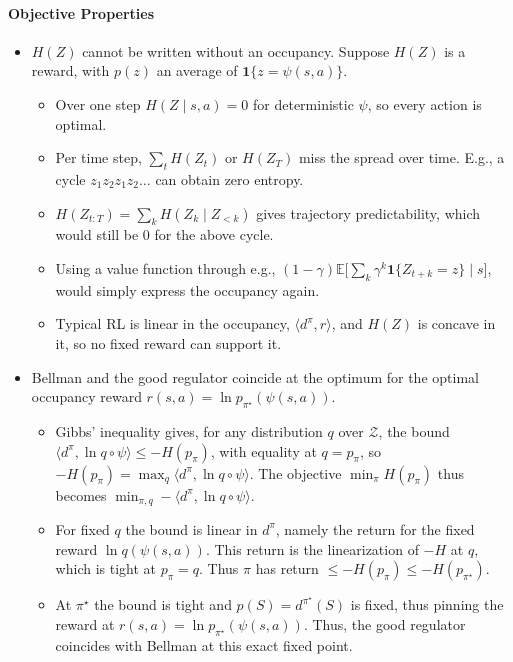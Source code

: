 \documentclass[10pt]{article}
\begin{document}
\paragraph{Objective Properties}
\begin{itemize}
  \item $H(Z)$ cannot be written without an occupancy.
    Suppose $H(Z)$ is a reward, with $p(z)$ an average of $\mathbf 1\{z = \psi(s,a)\}$.
  \begin{itemize}
    \item Over one step $H(Z \mid s,a) = 0$ for deterministic $\psi$, so every action is optimal.
    \item Per time step, $\sum_t H(Z_t)$ or $H(Z_T)$ miss the spread over time.
      E.g., a cycle $z_1 z_2 z_1 z_2 \dots$ can obtain zero entropy.
    \item $H(Z_{t:T}) = \sum_k H(Z_k \mid Z_{<k})$ gives trajectory predictability, which would still be $0$ for the above cycle.
    \item Using a value function through e.g., $(1-\gamma)\mathbb E\big[\sum_k \gamma^k \mathbf 1\{Z_{t+k} = z\} \mid s\big]$, would simply express the occupancy again.
    \item Typical RL is linear in the occupancy, $\langle d^\pi, r \rangle$, and $H(Z)$ is concave in it, so no fixed reward can support it.
  \end{itemize}
  \item Bellman and the good regulator coincide at the optimum for the optimal occupancy reward $r(s,a) = \ln p_{\pi^\star}(\psi(s,a))$.
  \begin{itemize}
    \item Gibbs' inequality gives, for any distribution $q$ over $\mathcal Z$, the bound $\langle d^\pi, \ln q \circ \psi \rangle \le -H(p_\pi)$, with equality at $q = p_\pi$, so $-H(p_\pi) = \max_q \langle d^\pi, \ln q \circ \psi \rangle$.
      The objective $\min_\pi H(p_\pi)$ thus becomes $\min_{\pi,q} -\langle d^\pi, \ln q \circ \psi \rangle$.
    \item For fixed $q$ the bound is linear in $d^\pi$, namely the return for the fixed reward $\ln q(\psi(s,a))$.
      This return is the linearization of $-H$ at $q$, which is tight at $p_\pi = q$.
      Thus $\pi$ has return $\le -H(p_\pi) \le -H(p_{\pi^\star})$.
    \item At $\pi^\star$ the bound is tight and $p(S) = d^{\pi^\star}(S)$ is fixed, thus pinning the reward at $r(s,a) = \ln p_{\pi^\star}(\psi(s,a))$.
      Thus, the good regulator coincides with Bellman at this exact fixed point.
  \end{itemize}
\end{itemize}
\end{document}
